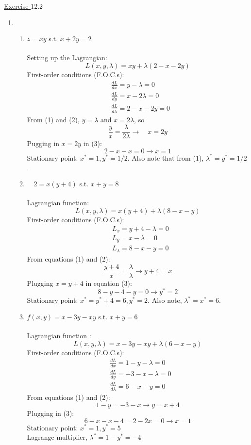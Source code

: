 \documentclass{./../../Latex/homework}
\begin{document}
\thispagestyle{plain}
\newcommand{\mytitle}{Homework 10 Solutions}
\myheader{\mytitle}

\underline{Exercise $12.2$} 
\begin{enumerate}

\item 
\begin{enumerate}

\item $z=x y$ s.t. $x+2 y=2$  \\~\\
Setting up the Lagrangian:
$$
L(x, y, \lambda)=x y+\lambda(2-x-2 y)
$$
First-order conditions (F.O.C.s):
\begin{align}
&\frac{d L}{d x}=y-\lambda=0 \\
&\frac{d L}{d y}=x-2 \lambda=0 \\
&\frac{d L}{d \lambda}=2-x-2 y=0
\end{align}
From (1) and (2), $y=\lambda$ and $x=2 \lambda$, so
$$
\frac{y}{x}=\frac{\lambda}{2 \lambda} \rightarrow \quad x=2 y
$$
Pugging in $x=2 y$ in (3):
$$
2-x-x=0 \rightarrow x=1
$$
Stationary point: $x^{*}=1, y^{*}=1/2$. 
Also note that from (1),  $\lambda^{*}=y^{*}=1/2$. \\

\item $\quad 2=x(y+4)$ s.t. $x+y=8$ \\~\\
Lagrangian function:
$$ L(x, y, \lambda)=x(y+4)+\lambda(8-x-y) $$
First-order conditions (F.O.C.s):
\setcounter{equation}{0}
\begin{align}
& L_{x}=y+4-\lambda=0 \\
& L_{y}=x-\lambda=0 \\
& L_{\lambda}=8-x-y=0
\end{align}
From equations (1) and (2):
$$
\frac{y+4}{x}=\frac{\lambda}{\lambda} \rightarrow y+4=x
$$
Plugging $x=y+4$ in equation (3):
$$
8-y-4-y=0 \rightarrow y^{*}=2
$$
Stationary point: $x^{*}=y^{*}+4=6, y^{*}=2$. Also note, $\lambda^{*}=x^{*}=6$. \\

\item $f(x, y)=x-3 y-x y$ s.t. $x+y=6$ \\~\\
Lagrangian function :
$$ L(x, y, \lambda)=x-3 y-x y+\lambda(6-x-y) $$
First-order conditions (F.O.C.s):
\setcounter{equation}{0}
\begin{align}
& \frac{d L}{d x}=1-y-\lambda=0 \\
& \frac{d L}{d y}=-3-x-\lambda=0 \\
& \frac{d L}{d \lambda}=6-x-y=0
\end{align}
From equations (1) and (2):
$$
1-y=-3-x \rightarrow y=x+4
$$
Plugging in (3):
$$
6-x-x-4=2-2 x=0 \rightarrow x=1
$$
Stationary point: $x^{*}=1, y^{*}=5$ \\
Lagrange multiplier, $\lambda^{*}=1-y^{*}=-4$ \\


\end{enumerate}
\end{enumerate}
\end{document}

